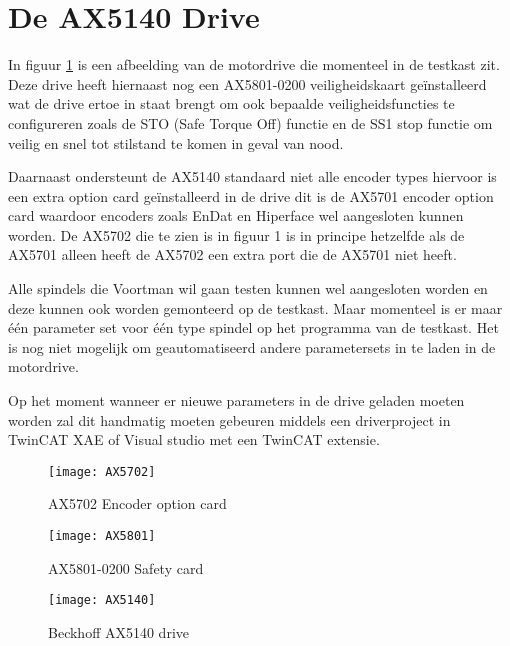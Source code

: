 \section{De AX5140 Drive}

In figuur \ref{fig:AX5140} is een afbeelding van de motordrive die momenteel in de testkast zit. Deze drive heeft hiernaast nog een \gls{AX5801}-0200 veiligheidskaart geïnstalleerd wat de drive ertoe in staat brengt om ook bepaalde veiligheidsfuncties te configureren zoals de \gls{STO} (Safe Torque Off) functie en de \gls{SS1} stop functie om veilig en snel tot stilstand te komen in geval van nood. \cite{web:AX5801}

\vspace{0.5cm}

Daarnaast ondersteunt de \gls{AX5140} standaard niet alle encoder types hiervoor is een extra option card geïnstalleerd in de drive dit is de \gls{AX5701} encoder option card waardoor encoders zoals EnDat en Hiperface wel aangesloten kunnen worden. De \gls{AX5702} die te zien is in figuur 1 is in principe hetzelfde als de \gls{AX5701} alleen heeft de \gls{AX5702} een extra port die de \gls{AX5701} niet heeft. 

\vspace{0.5cm}

Alle spindels die Voortman wil gaan testen kunnen wel aangesloten worden en deze kunnen ook worden gemonteerd op de testkast. Maar momenteel is er maar één parameter set voor één type spindel op het programma van de testkast. Het is nog niet mogelijk om geautomatiseerd andere parametersets in te laden in de motordrive.

\vspace{0.5cm}

Op het moment wanneer er nieuwe parameters in de drive geladen moeten worden zal dit handmatig moeten gebeuren middels een driverproject in \gls{TwinCAT} XAE of Visual studio met een \gls{TwinCAT} extensie.


\begin{figure}[h]
	\centering
	\begin{minipage}{0.32\textwidth}
		\texttt{[image: AX5702]}
		\vspace{0pt}
		\caption{\gls{AX5702} Encoder option card \cite{web:AX5701}}
		\label{fig:AX5702}
	\end{minipage}
	\hfill
	\begin{minipage}{0.32\textwidth}
		\texttt{[image: AX5801]}
		\vspace{0pt}
		\caption{\gls{AX5801}-0200 Safety card \cite{web:AX5801}}
		\label{fig:AX5801}
	\end{minipage}
	\hfill
	\begin{minipage}{0.32\textwidth}
		\texttt{[image: AX5140]}
		\vspace{0pt}
		\caption{Beckhoff \gls{AX5140} drive \cite{web:AX5140Drive}}
		\label{fig:AX5140}
	\end{minipage}
\end{figure}

